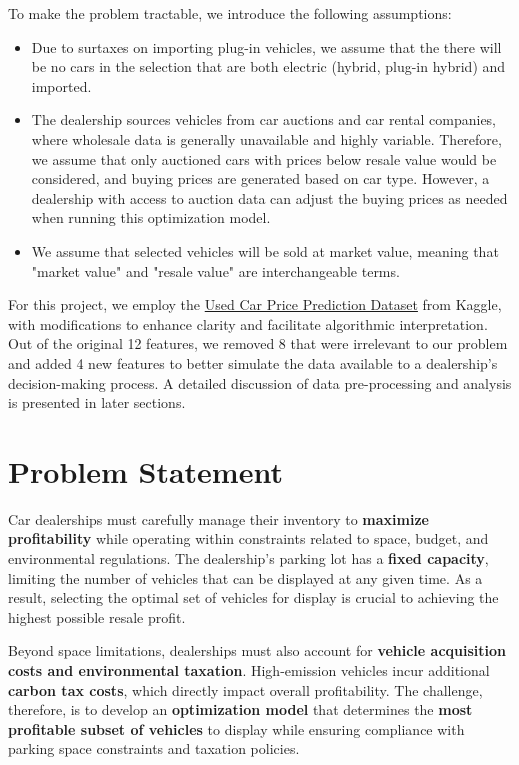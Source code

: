 \documentclass{article}
\begin{document}
To make the problem tractable, we introduce the following assumptions:
\begin{itemize}
    \item Due to surtaxes on importing plug-in vehicles, we assume that the there will be no cars in the selection that are both electric (hybrid, plug-in hybrid) and imported.
    \item The dealership sources vehicles from car auctions and car rental companies, where wholesale data is generally unavailable and highly variable. Therefore, we assume that only auctioned cars with prices below resale value would be considered, and buying prices are generated based on car type. However, a dealership with access to auction data can adjust the buying prices as needed when running this optimization model.
    \item We assume that selected vehicles will be sold at market value, meaning that "market value" and "resale value" are interchangeable terms.
\end{itemize}


For this project, we employ the \href{https://www.kaggle.com/datasets/taeefnajib/used-car-price-prediction-dataset/data}{Used Car Price Prediction Dataset} from Kaggle, with modifications to enhance clarity and facilitate algorithmic interpretation. Out of the original 12 features, we removed 8 that were irrelevant to our problem and added 4 new features to better simulate the data available to a dealership’s decision-making process. A detailed discussion of data pre-processing and analysis is presented in later sections.





\section{Problem Statement}
Car dealerships must carefully manage their inventory to \textbf{maximize profitability} while operating within constraints related to space, budget, and environmental regulations. The dealership's parking lot has a \textbf{fixed capacity}, limiting the number of vehicles that can be displayed at any given time. As a result, selecting the optimal set of vehicles for display is crucial to achieving the highest possible resale profit.  

Beyond space limitations, dealerships must also account for \textbf{vehicle acquisition costs and environmental taxation}. High-emission vehicles incur additional \textbf{carbon tax costs}, which directly impact overall profitability. The challenge, therefore, is to develop an \textbf{optimization model} that determines the \textbf{most profitable subset of vehicles} to display while ensuring compliance with parking space constraints and taxation policies.  
\end{document}

